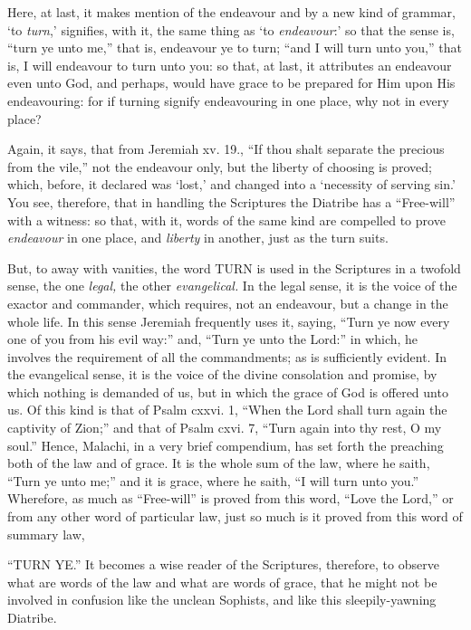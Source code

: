 Here, at last, it makes mention of the endeavour and by a new kind of grammar, ‘to \emph{turn},’ signifies, with it, the same thing as ‘to \emph{endeavour}:’ so that the sense is, “turn ye unto me,” that is, endeavour ye to turn; “and I will turn unto you,” that is, I will endeavour to turn unto you: so that, at last, it attributes an endeavour even unto God, and perhaps, would have grace to be prepared for Him upon His endeavouring: for if turning signify endeavouring in one place, why not in every place?

Again, it says, that from Jeremiah xv. 19., “If thou shalt separate the precious from the vile,” not the endeavour only, but the liberty of choosing is proved; which, before, it declared was ‘lost,’ and changed into a ‘necessity of serving sin.’ You see, therefore, that in handling the Scriptures the Diatribe has a “Free-will” with a witness: so that, with it, words of the same kind are compelled to prove \emph{endeavour }in one place, and \emph{liberty }in another, just as the turn suits.

But, to away with vanities, the word TURN is used in the Scriptures in a twofold sense, the one \emph{ legal, }the other \emph{evangelical. }In the legal sense, it is the voice of the exactor and commander, which requires, not an endeavour, but a change in the whole life. In this sense Jeremiah frequently uses it, saying, “Turn ye now every one of you from his evil way:” and, “Turn ye unto the Lord:” in which, he involves the requirement of all the commandments; as is sufficiently evident. In the evangelical sense, it is the voice of the divine consolation and promise, by which nothing is demanded of us, but in which the grace of God is offered unto us. Of this kind is that of Psalm cxxvi. 1, “When the Lord shall turn again the captivity of Zion;” and that of Psalm cxvi. 7, “Turn again into thy rest, O my soul.” Hence, Malachi, in a very brief compendium, has set forth the preaching both of the law and of grace. It is the whole sum of the law, where he saith, “Turn ye unto me;” and it is grace, where he saith, “I will turn unto you.” Wherefore, as much as “Free-will” is proved from this word, “Love the Lord,” or from any other word of particular law, just so much is it proved from this word of summary law,

“TURN YE.” It becomes a wise reader of the Scriptures, therefore, to observe what are words of the law and what are words of grace, that he might not be involved in confusion like the unclean Sophists, and like this sleepily-yawning Diatribe.

